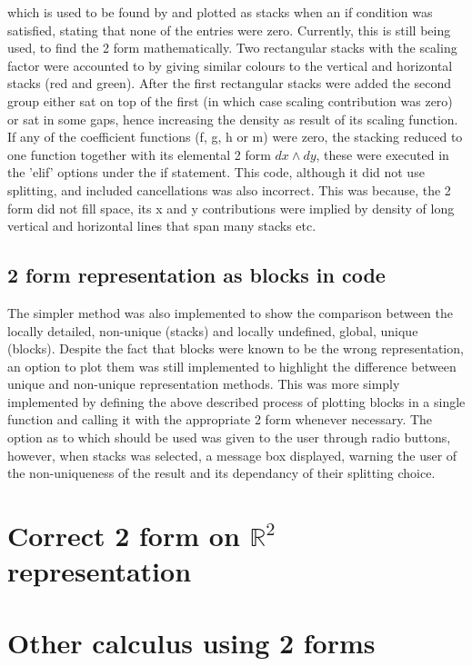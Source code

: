 \documentclass[11]{report}
\begin{document}
which is used to be found by and plotted as stacks when an if condition was satisfied, stating that none of the entries were zero. Currently, this is still being used, to find the 2 form mathematically.
Two rectangular stacks with the scaling factor were accounted to by giving similar colours to the vertical  and horizontal stacks (red and green). After the first rectangular stacks were added the second group either sat on top of the first (in which case scaling contribution was zero) or sat in some gaps, hence increasing the density as result of its scaling function.
If any of the coefficient functions (f, g, h or m) were zero, the stacking reduced to one function together with its elemental 2 form $dx\wedge dy$, these were executed in the 'elif' options under the if statement. This code, although it did not use splitting, and included cancellations was also incorrect. This was because, the 2 form did not fill space, its x and y contributions were implied by density of long vertical and horizontal lines that span many stacks etc.


\subsection{2 form representation as blocks in code}
The simpler method was also implemented to show the comparison between the  locally detailed, non-unique (stacks) and locally undefined, global, unique (blocks). Despite the fact that blocks were known to be the wrong representation, an option to plot them was still implemented to highlight the difference between unique and non-unique representation methods. 
This was more simply implemented by defining the above described process of plotting blocks in a single function and calling it with the appropriate 2 form whenever necessary.
The option as to which should be used was given to the user through radio buttons, however, when stacks was selected, a message box displayed, warning the user of the non-uniqueness of the result and its dependancy of their splitting choice.

\section{Correct 2 form on $\mathbb{R}^{2}$ representation}




\section{Other calculus using 2 forms}
\end{document}
